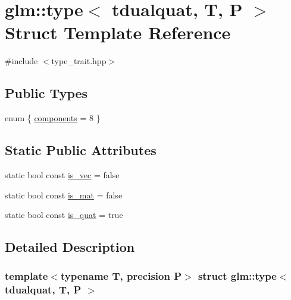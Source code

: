 \hypertarget{structglm_1_1type_3_01tdualquat_00_01_t_00_01_p_01_4}{}\section{glm\+::type$<$ tdualquat, T, P $>$ Struct Template Reference}
\label{structglm_1_1type_3_01tdualquat_00_01_t_00_01_p_01_4}


{\ttfamily \#include $<$type\+\_\+trait.\+hpp$>$}

\subsection*{Public Types}
\begin{DoxyCompactItemize}
\item 
enum \{ \mbox{\hyperlink{structglm_1_1type_3_01tdualquat_00_01_t_00_01_p_01_4_a9d8780911d2c669abeb74b149e477116a95326e874f0bb50afc5b3cc19d092cc1}{components}} = 8
 \}
\end{DoxyCompactItemize}
\subsection*{Static Public Attributes}
\begin{DoxyCompactItemize}
\item 
static bool const \mbox{\hyperlink{structglm_1_1type_3_01tdualquat_00_01_t_00_01_p_01_4_a89d63524f1e7f9f54a545c9ddd1cc8b4}{is\+\_\+vec}} = false
\item 
static bool const \mbox{\hyperlink{structglm_1_1type_3_01tdualquat_00_01_t_00_01_p_01_4_a4ff76551c61e4695135ea1e346d3a49e}{is\+\_\+mat}} = false
\item 
static bool const \mbox{\hyperlink{structglm_1_1type_3_01tdualquat_00_01_t_00_01_p_01_4_a4a599be3c9026cb94b95daf760a5edc1}{is\+\_\+quat}} = true
\end{DoxyCompactItemize}


\subsection{Detailed Description}
\subsubsection*{template$<$typename T, precision P$>$\newline
struct glm\+::type$<$ tdualquat, T, P $>$}



